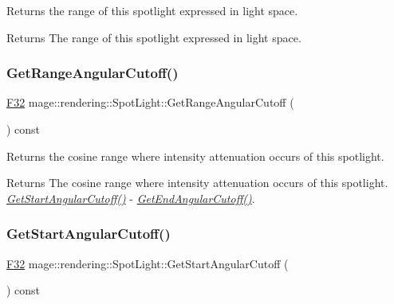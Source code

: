 Returns the range of this spotlight expressed in light space.

\begin{DoxyReturn}{Returns}
The range of this spotlight expressed in light space. 
\end{DoxyReturn}
\hypertarget{classmage_1_1rendering_1_1_spot_light_abd442757ce094619b8f4c050e54403e1}{}\label{classmage_1_1rendering_1_1_spot_light_abd442757ce094619b8f4c050e54403e1} 
\subsubsection{\texorpdfstring{Get\+Range\+Angular\+Cutoff()}{GetRangeAngularCutoff()}}
{\footnotesize\ttfamily \hyperlink{namespacemage_aa97e833b45f06d60a0a9c4fc22ae02c0}{F32} mage\+::rendering\+::\+Spot\+Light\+::\+Get\+Range\+Angular\+Cutoff (\begin{DoxyParamCaption}{ }\end{DoxyParamCaption}) const\hspace{0.3cm}{\ttfamily [noexcept]}}

Returns the cosine range where intensity attenuation occurs of this spotlight.

\begin{DoxyReturn}{Returns}
The cosine range where intensity attenuation occurs of this spotlight. {\itshape \hyperlink{classmage_1_1rendering_1_1_spot_light_ab865663954e848ad42c84e759c7ceea7}{Get\+Start\+Angular\+Cutoff()}} -\/ {\itshape \hyperlink{classmage_1_1rendering_1_1_spot_light_aab94a7a9d5434d8e7913d7b52379841b}{Get\+End\+Angular\+Cutoff()}}. 
\end{DoxyReturn}
\hypertarget{classmage_1_1rendering_1_1_spot_light_ab865663954e848ad42c84e759c7ceea7}{}\label{classmage_1_1rendering_1_1_spot_light_ab865663954e848ad42c84e759c7ceea7} 
\subsubsection{\texorpdfstring{Get\+Start\+Angular\+Cutoff()}{GetStartAngularCutoff()}}
{\footnotesize\ttfamily \hyperlink{namespacemage_aa97e833b45f06d60a0a9c4fc22ae02c0}{F32} mage\+::rendering\+::\+Spot\+Light\+::\+Get\+Start\+Angular\+Cutoff (\begin{DoxyParamCaption}{ }\end{DoxyParamCaption}) const\hspace{0.3cm}{\ttfamily [noexcept]}}

